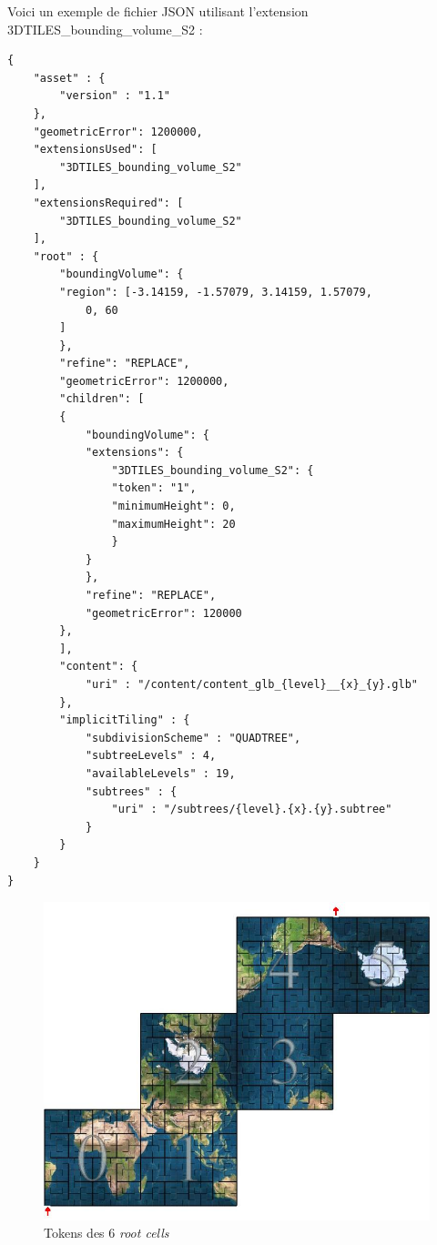 \newpage

Voici un exemple de fichier JSON utilisant l'extension 3DTILES\_bounding\_volume\_S2 :

\begin{verbatim}
{
    "asset" : {
        "version" : "1.1"
    },
    "geometricError": 1200000,
    "extensionsUsed": [
        "3DTILES_bounding_volume_S2"
    ],
    "extensionsRequired": [
        "3DTILES_bounding_volume_S2"
    ],
    "root" : {
        "boundingVolume": {
        "region": [-3.14159, -1.57079, 3.14159, 1.57079,
            0, 60
        ]
        },
        "refine": "REPLACE",
        "geometricError": 1200000,
        "children": [
        {
            "boundingVolume": {
            "extensions": {
                "3DTILES_bounding_volume_S2": {
                "token": "1",
                "minimumHeight": 0,
                "maximumHeight": 20
                }
            }
            },
            "refine": "REPLACE",
            "geometricError": 120000
        },
        ],
        "content": {
            "uri" : "/content/content_glb_{level}__{x}_{y}.glb"
        },
        "implicitTiling" : {
            "subdivisionScheme" : "QUADTREE",
            "subtreeLevels" : 4,
            "availableLevels" : 19,
            "subtrees" : {
                "uri" : "/subtrees/{level}.{x}.{y}.subtree"
            }
        }
    }
}
\end{verbatim}

\begin{figure}[H]
    \centering
    \includegraphics[width=1\textwidth]{assets/figures/s2cell_global.jpg}
    \caption{Tokens des 6 \textit{root cells} \cite{3DTILES_bounding_volume_S2-website}}
    \label{fig:s2-ext}
\end{figure}

